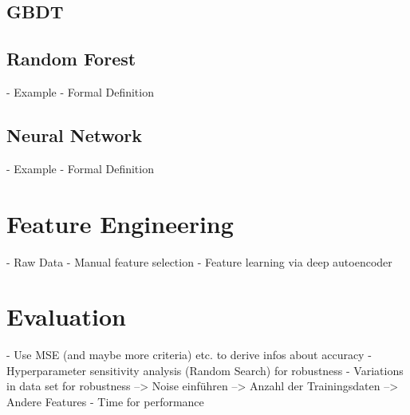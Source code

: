 \subsection{GBDT}

\subsection{Random Forest}
- Example
- Formal Definition
\subsection{Neural Network}
- Example
- Formal Definition

\section{Feature Engineering}

- Raw Data 
- Manual feature selection
- Feature learning via deep autoencoder

\section{Evaluation} 
- Use MSE (and maybe more criteria) etc. to derive infos about accuracy
- Hyperparameter sensitivity analysis (Random Search) for robustness
- Variations in data set for robustness
--> Noise einführen 
--> Anzahl der Trainingsdaten
--> Andere Features
- Time for performance




















